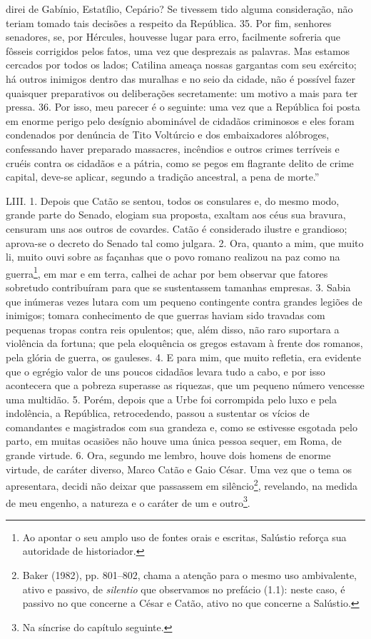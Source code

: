 direi de Gabínio, Estatílio, Cepário? Se tivessem tido alguma consideração, não
teriam tomado tais decisões a respeito da República. 35. Por fim, senhores
senadores, se, por Hércules, houvesse lugar para erro, facilmente sofreria que
fôsseis corrigidos pelos fatos, uma vez que desprezais as palavras. Mas estamos
cercados por todos os lados; Catilina ameaça nossas gargantas com seu exército;
há outros inimigos dentro das muralhas e no seio da cidade, não é possível
fazer quaisquer preparativos ou deliberações secretamente: um motivo a mais
para ter pressa. 36. Por isso, meu parecer é o seguinte: uma vez que a
República foi posta em enorme perigo pelo desígnio abominável de cidadãos
criminosos e eles foram condenados por denúncia de Tito Voltúrcio e dos
embaixadores alóbroges, confessando haver preparado massacres, incêndios e
outros crimes terríveis e cruéis contra os cidadãos e a pátria, como se pegos
em flagrante delito de crime capital, deve-se aplicar, segundo a tradição
ancestral, a pena de morte.''

LIII. 1. Depois que Catão se sentou, todos os consulares e, do mesmo modo,
grande parte do Senado, elogiam sua proposta, exaltam aos céus sua bravura, censuram uns aos outros de covardes. Catão é considerado ilustre e
grandioso; aprova-se o decreto do Senado tal como julgara. 2. Ora, quanto a
mim, que muito li, muito ouvi sobre as façanhas que o povo romano realizou na
paz como na guerra\footnote{Ao apontar o seu amplo uso de fontes orais e
escritas, Salústio reforça sua autoridade de historiador.}, em mar e em terra,
calhei de achar por bem observar que fatores sobretudo contribuíram para que se
sustentassem tamanhas empresas. 3. Sabia que inúmeras vezes lutara com um
pequeno contingente contra grandes legiões de inimigos; tomara conhecimento de
que guerras haviam sido travadas com pequenas tropas contra reis opulentos;
que, além disso, não raro suportara a violência da fortuna; que pela eloquência
os gregos estavam à frente dos romanos, pela glória de guerra, os gauleses. 4.
E para mim, que muito refletia, era evidente que o egrégio valor de uns poucos
cidadãos levara tudo a cabo, e por isso acontecera que a pobreza superasse as
riquezas, que um pequeno número vencesse uma multidão. 5. Porém, depois que a
Urbe foi corrompida pelo luxo e pela indolência, a República, retrocedendo,
passou a sustentar os vícios de comandantes e magistrados com sua grandeza e,
como se estivesse esgotada pelo parto, em muitas ocasiões não houve uma única
pessoa sequer, em Roma, de grande virtude. 6. Ora, segundo me lembro, houve
dois homens de enorme virtude, de caráter diverso, Marco Catão e Gaio César.
Uma vez que o tema os apresentara, decidi não deixar que passassem em
silêncio\footnote{Baker (1982), pp. 801--802, chama a atenção para o mesmo uso
ambivalente, ativo e passivo, de \emph{silentio} que observamos no prefácio (1.1): neste caso, é passivo no que concerne a César e Catão, ativo no que
concerne a Salústio.}, revelando, na medida de meu engenho, a natureza e o
caráter de um e outro\footnote{Na síncrise do capítulo seguinte.}. 

